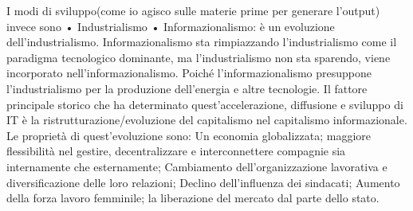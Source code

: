\documentclass[11pt, a4page, twocolumn]{article}
\begin{document}
I modi di sviluppo(come io agisco sulle materie prime per generare l’output) invece sono
    • Industrialismo
    • Informazionalismo: è un evoluzione dell’industrialismo.
Informazionalismo sta rimpiazzando l’industrialismo come il paradigma tecnologico dominante, ma l’industrialismo non sta sparendo, viene incorporato nell’informazionalismo. Poiché l’informazionalismo presuppone l’industrialismo per la produzione dell’energia e altre tecnologie. 
Il fattore principale storico che ha determinato quest’accelerazione, diffusione e sviluppo di IT è la ristrutturazione/evoluzione del capitalismo nel capitalismo informazionale. Le proprietà di quest’evoluzione sono: Un economia globalizzata; maggiore flessibilità nel gestire, decentralizzare e interconnettere compagnie sia internamente che esternamente; Cambiamento dell’organizzazione lavorativa e diversificazione delle loro relazioni; Declino dell’influenza dei sindacati; Aumento della forza lavoro femminile; la liberazione del mercato dal parte dello stato.
\end{document}
